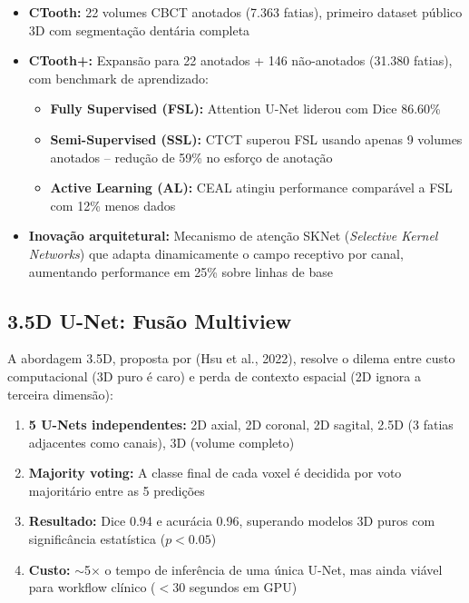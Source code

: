\begin{itemize}
  \item \textbf{CTooth:} 22 volumes CBCT anotados (7.363 fatias), primeiro
        dataset público 3D com segmentação dentária completa
  \item \textbf{CTooth+:} Expansão para 22 anotados + 146 não-anotados
        (31.380 fatias), com benchmark de aprendizado:
        \begin{itemize}
          \item \textbf{Fully Supervised (FSL):} Attention U-Net liderou com
                Dice 86.60\%
          \item \textbf{Semi-Supervised (SSL):} CTCT superou FSL usando apenas
                9 volumes anotados -- redução de 59\% no esforço de anotação
          \item \textbf{Active Learning (AL):} CEAL atingiu performance comparável
                a FSL com 12\% menos dados
        \end{itemize}
  \item \textbf{Inovação arquitetural:} Mecanismo de atenção SKNet (\textit{Selective
        Kernel Networks}) que adapta dinamicamente o campo receptivo por canal,
        aumentando performance em 25\% sobre linhas de base
\end{itemize}

\subsection{3.5D U-Net: Fusão Multiview}

A abordagem 3.5D, proposta por  (Hsu et al., 2022), resolve
o dilema entre custo computacional (3D puro é caro) e perda de contexto espacial
(2D ignora a terceira dimensão):

\begin{enumerate}
  \item \textbf{5 U-Nets independentes:} 2D axial, 2D coronal, 2D sagital,
        2.5D (3 fatias adjacentes como canais), 3D (volume completo)
  \item \textbf{Majority voting:} A classe final de cada voxel é decidida por
        voto majoritário entre as 5 predições
  \item \textbf{Resultado:} Dice 0.94 e acurácia 0.96, superando modelos 3D
        puros com significância estatística ($p < 0.05$)
  \item \textbf{Custo:} $\sim$5$\times$ o tempo de inferência de uma única
        U-Net, mas ainda viável para workflow clínico ($< 30$ segundos em GPU)
\end{enumerate}

